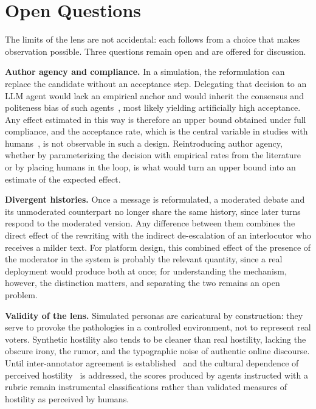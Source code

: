 \documentclass[conference]{IEEEtran}
\begin{document}
\section{Open Questions}\label{sec:open}

The limits of the lens are not accidental: each follows from a choice that
makes observation possible. Three questions remain open and are offered for
discussion.

\textbf{Author agency and compliance.} In a simulation, the reformulation can
replace the candidate without an acceptance step. Delegating that decision to
an LLM agent would lack an empirical anchor and would inherit the consensus
and politeness bias of such agents~\cite{chuang2023simulating}, most likely
yielding artificially high acceptance. Any effect estimated in this way is
therefore an upper bound obtained under full compliance, and the acceptance
rate, which is the central variable in studies with
humans~\cite{argyle2023leveraging,katsaros2022reconsidering}, is not
observable in such a design. Reintroducing author agency, whether by
parameterizing the decision with empirical rates from the
literature~\cite{katsaros2022reconsidering} or by placing humans in the loop,
is what would turn an upper bound into an estimate of the expected effect.

\textbf{Divergent histories.} Once a message is reformulated, a moderated
debate and its unmoderated counterpart no longer share the same history,
since later turns respond to the moderated version. Any difference between
them combines the direct effect of the rewriting with the indirect
de-escalation of an interlocutor who receives a milder text. For platform
design, this combined effect of the presence of the moderator in the system
is probably the relevant quantity, since a real deployment would produce both
at once; for understanding the mechanism, however, the distinction matters,
and separating the two remains an open problem.


\textbf{Validity of the lens.} Simulated personas are caricatural by
construction: they serve to provoke the pathologies in a controlled
environment, not to represent real voters. Synthetic hostility also tends to
be cleaner than real hostility, lacking the obscure irony, the rumor, and the
typographic noise of authentic online discourse. Until inter-annotator
agreement is established~\cite{krippendorff2011computing} and the cultural
dependence of perceived
hostility~\cite{papacharissi2004democracy,rossini2022beyond} is addressed, the
scores produced by agents instructed with a rubric remain instrumental
classifications rather than validated measures of hostility as perceived by
humans.
\end{document}

